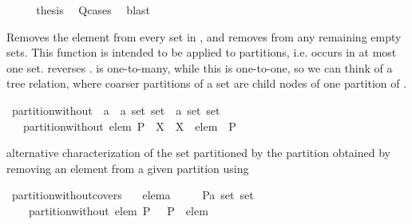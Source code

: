 \begin{isabellebody}
\isanewline
\ \ \isamarkupfalse%
\ \isamarkupfalse%
\ {\isacharquery}thesis\ \isamarkupfalse%
\ Q{\isacharunderscore}cases\ \isamarkupfalse%
\ blast\isanewline
{}\isamarkupfalse%
%
\endisatagproof
{\isafoldproof}%
%
\isadelimproof
%
\endisadelimproof
%
\begin{isamarkuptext}%
Removes the element  from every set in , and removes from  any
  remaining empty sets.  This function is intended to be applied to partitions, i.e. 
  occurs in at most one set.   reverses .
 is one-to-many, while this is one-to-one, so we can think of a tree relation,
where coarser partitions of a set  are child nodes of one partition of .%
\end{isamarkuptext}%
\isamarkuptrue%
\isamarkupfalse%
\ partition{\isacharunderscore}without\ {\isacharcolon}{\isacharcolon}\ {\isachardoublequoteopen}{\isacharprime}a\ {\isasymRightarrow}\ {\isacharprime}a\ set\ set\ {\isasymRightarrow}\ {\isacharprime}a\ set\ set{\isachardoublequoteclose}\isanewline
\ \ \ {\isachardoublequoteopen}partition{\isacharunderscore}without\ elem\ P\ {\isacharequal}\ {\isacharparenleft}{\isasymlambda}X\ {\isachardot}\ X\ {\isacharminus}\ {\isacharbraceleft}elem{\isacharbraceright}{\isacharparenright}\ {\isacharbackquote}\ P\ {\isacharminus}\ {\isacharbraceleft}{\isacharbraceleft}{\isacharbraceright}{\isacharbraceright}{\isachardoublequoteclose}%
\begin{isamarkuptext}%
alternative characterization of the set partitioned by the partition obtained 
  by removing an element from a given partition using %
\end{isamarkuptext}%
\isamarkuptrue%
\isamarkupfalse%
\ partition{\isacharunderscore}without{\isacharunderscore}covers{\isacharcolon}\isanewline
\ \ \ elem{\isacharcolon}{\isacharcolon}{\isacharprime}a\isanewline
\ \ \ \ \ P{\isacharcolon}{\isacharcolon}{\isachardoublequoteopen}{\isacharprime}a\ set\ set{\isachardoublequoteclose}\isanewline
\ \ \ {\isachardoublequoteopen}{\isasymUnion}\ partition{\isacharunderscore}without\ elem\ P\ {\isacharequal}\ {\isacharparenleft}{\isasymUnion}\ P{\isacharparenright}\ {\isacharminus}\ {\isacharbraceleft}elem{\isacharbraceright}{\isachardoublequoteclose}\isanewline

\end{isabellebody}
